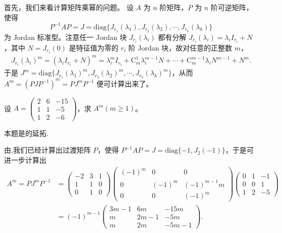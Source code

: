 \documentclass[../../main.tex]{subfiles}
\begin{document}
首先，我们来看计算矩阵乘幂的问题。
设 $A$ 为 $n$ 阶矩阵，$P$ 为 $n$ 阶可逆矩阵，使得 
\[
P^{-1}AP = J = \mathrm{diag}\{J_{r_1}(\lambda_1), J_{r_2}(\lambda_2), \cdots, J_{r_k}(\lambda_k)\}
\] 
为 Jordan 标准型。注意任一 Jordan 块 $J_{r_i}(\lambda_i)$ 都有分解 $J_{r_i}(\lambda_i) = \lambda_i I_{r_i} + N$，其中 $N = J_{r_i}(0)$ 是特征值为零的 $r_i$ 阶 Jordan 块，故对任意的正整数 $m$，
\begin{align*}
J_{r_i}(\lambda_i)^m = (\lambda_i I_{r_i} + N)^m = \lambda_i^m I_{r_i} + \mathrm{C}_m^1 \lambda_i^{m - 1} N + \cdots + \mathrm{C}_m^{m - 1} \lambda_i N^{m - 1} + N^m.
\end{align*}
于是 $J^m = \mathrm{diag}\{J_{r_1}(\lambda_1)^m, J_{r_2}(\lambda_2)^m, \cdots, J_{r_k}(\lambda_k)^m\}$，从而 $A^m = (PJP^{-1})^m = PJ^mP^{-1}$ 便可计算出来了。 

\begin{example}
设 $A = \begin{pmatrix}
2 & 6 & -15 \\
1 & 1 & -5 \\
1 & 2 & -6
\end{pmatrix}$，求 $A^m (m \geqslant  1)$。
\end{example}
\begin{remark}
本题是的延拓.
\end{remark}
\begin{solution}
由,我们已经计算出过渡矩阵 $P$，使得 $P^{-1}AP = J = \mathrm{diag}\{-1, J_2(-1)\}$，于是可进一步计算出
\begin{align*}
A^m = PJ^mP^{-1} &= \begin{pmatrix}
-2 & 3 & 1 \\
1 & 1 & 0 \\
0 & 1 & 0
\end{pmatrix}
\begin{pmatrix}
(-1)^m & 0 & 0 \\
0 & (-1)^m & (-1)^{m - 1}m \\
0 & 0 & (-1)^m
\end{pmatrix}
\begin{pmatrix}
0 & 1 & -1 \\
0 & 0 & 1 \\
1 & 2 & -5
\end{pmatrix}\\
&= (-1)^{m - 1}
\begin{pmatrix}
3m - 1 & 6m & -15m \\
m & 2m - 1 & -5m \\
m & 2m & -5m - 1
\end{pmatrix}. 
\end{align*}
\end{solution}
\end{document}
